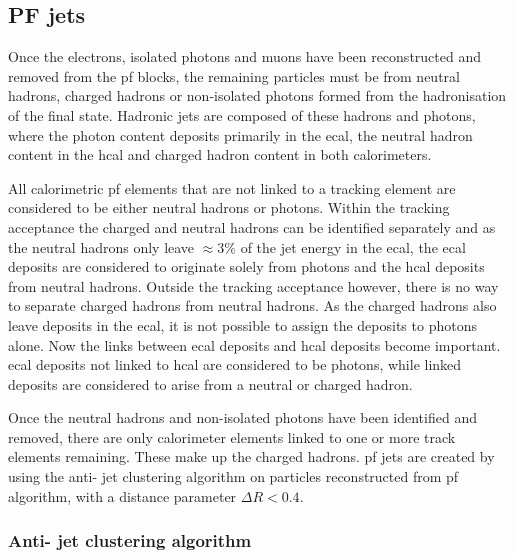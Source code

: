 
\subsection{PF jets} %
\label{sub:pf_jets}

Once the electrons, isolated photons and muons have been reconstructed and removed from the \acrshort{pf} blocks, the remaining particles must be from neutral hadrons, charged hadrons or non-isolated photons formed from the hadronisation of the final state.
Hadronic jets are composed of these hadrons and photons, where the photon content deposits primarily in the \acrshort{ecal}, the neutral hadron content in the \acrshort{hcal} and charged hadron content in both calorimeters.

All calorimetric \acrshort{pf} elements that are not linked to a tracking element are considered to be either neutral hadrons or photons.
Within the tracking acceptance the charged and neutral hadrons can be identified separately and as the neutral hadrons only leave $\approx3\%$ of the jet energy in the \acrshort{ecal}, the \acrshort{ecal} deposits are considered to originate solely from photons and the \acrshort{hcal} deposits from neutral hadrons.
Outside the tracking acceptance however, there is no way to separate charged hadrons from neutral hadrons.
As the charged hadrons also leave deposits in the \acrshort{ecal}, it is not possible to assign the deposits to photons alone.
Now the links between \acrshort{ecal} deposits and \acrshort{hcal} deposits become important. 
\acrshort{ecal} deposits not linked to \acrshort{hcal} are considered to be photons, while linked deposits are considered to arise from a neutral or charged hadron.

Once the neutral hadrons and non-isolated photons have been identified and removed, there are only calorimeter elements linked to one or more track elements remaining.
These make up the charged hadrons.
\acrshort{pf} jets are created by using the anti-\kt{} jet clustering algorithm on particles reconstructed from \acrshort{pf} algorithm, with a distance parameter $\Delta R<0.4$.

\subsubsection{Anti-\kt{} jet clustering algorithm} %
\label{ssub:antikt}

